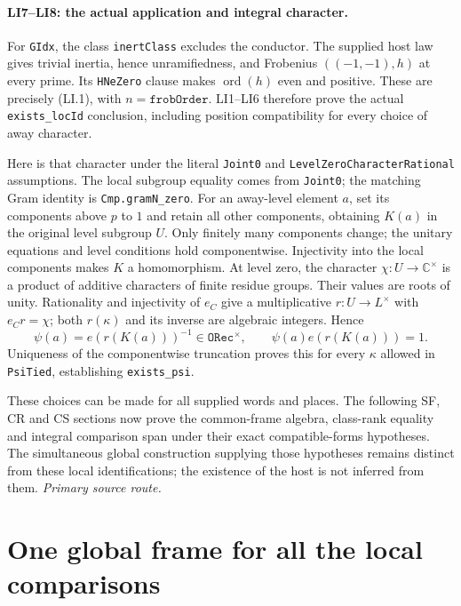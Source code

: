 \documentclass[11pt,a4paper]{article}
\numberwithin{equation}{section}
\theoremstyle{remark}\newtheorem{remark}[theorem]{Remark}
\begin{document}
\paragraph{LI7--LI8: the actual application and integral character.}
For \texttt{GIdx}, the class \texttt{inertClass} excludes the conductor.
The supplied host law gives trivial inertia, hence unramifiedness, and
Frobenius $((-1,-1),h)$ at every prime. Its \texttt{HNeZero} clause
makes $\operatorname{ord}(h)$ even and positive. These are precisely
(LI.1), with $n=\texttt{frobOrder}$. LI1--LI6 therefore prove the actual
\texttt{exists\_locId} conclusion, including position compatibility
for every choice of away character.

Here is that character under the literal \texttt{Joint0} and
\texttt{LevelZeroCharacterRational} assumptions. The local subgroup
equality comes from \texttt{Joint0}; the matching Gram identity is
\texttt{Cmp.gramN\_zero}. For an away-level
element $a$, set its components above $p$ to $1$ and retain all other
components, obtaining $K(a)$ in the original level subgroup $U$.
Only finitely many components change; the unitary equations and level
conditions hold componentwise. Injectivity into the local components
makes $K$ a homomorphism. At level zero, the character
$\chi:U\to\mathbb C^\times$ is a product of additive characters of
finite residue groups. Their values are roots of unity. Rationality
and injectivity of $e_C$ give a multiplicative $r:U\to L^\times$
with $e_Cr=\chi$; both $r(\kappa)$ and its inverse are algebraic
integers. Hence
\[
 \psi(a)=e(r(K(a)))^{-1}\in\texttt{ORec}^{\times},
 \qquad \psi(a)e(r(K(a)))=1.                            \tag{LI.11}
\]
Uniqueness of the componentwise truncation proves this for every
$\kappa$ allowed in \texttt{PsiTied}, establishing \texttt{exists\_psi}.

These choices can be made for all supplied words and places. The
following SF, CR and CS sections now prove the common-frame algebra,
class-rank equality and integral comparison span under their exact
compatible-forms hypotheses. The simultaneous global construction
supplying those hypotheses remains distinct from these local
identifications; the existence of the host is not inferred from them.
\noindent\textit{Primary source route.}\cite{actual-local-places}


\section{One global frame for all the local comparisons}
\label{sec:standard-global-frame}
\end{document}
